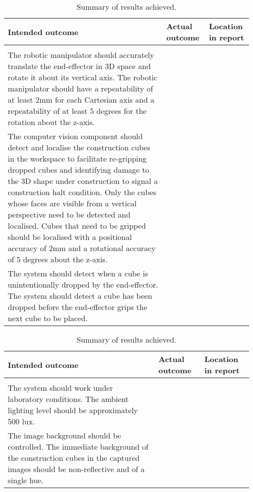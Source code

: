 \begin{table}[h]
	\renewcommand{\arraystretch}{1.3}
	\centering
	\begin{tabular}{|>{\raggedright}m{6.5cm}|>{\raggedright}m{5cm}|>{\raggedright\arraybackslash}m{3cm}|}
		\hline
		\textbf{Intended outcome} & \textbf{Actual outcome} & \textbf{Location in report} \\
		\hline
		\multicolumn{3}{|l|}{\textbf{Core mission requirements and specifications}} \\
		\hline
		The robotic manipulator should accurately translate the end-effector in 3D space and rotate it about its vertical axis. The robotic manipulator should have a repeatability of at least 2mm for each Cartesian axis and a repeatability of at least 5 degrees for the rotation about the z-axis. & & \\
		\hline
		The computer vision component should detect and localise the construction cubes in the workspace to facilitate re-gripping dropped cubes and identifying damage to the 3D shape under construction to signal a construction halt condition. Only the cubes whose faces are visible from a vertical perspective need to be detected and localised. Cubes that need to be gripped should be localised with a positional accuracy of 2mm and a rotational accuracy of 5 degrees about the z-axis. & & \\
		\hline
		The system should detect when a cube is unintentionally dropped by the end-effector. The system should detect a cube has been dropped before the end-effector grips the next cube to be placed. & & \\
		\hline
	\end{tabular}
	\caption{\label{tab:results_summary_p2}Summary of results achieved.}
\end{table}

\begin{table}[h]
	\renewcommand{\arraystretch}{1.3}
	\centering
	\begin{tabular}{|>{\raggedright}m{6.5cm}|>{\raggedright}m{5cm}|>{\raggedright\arraybackslash}m{3cm}|}
		\hline
		\textbf{Intended outcome} & \textbf{Actual outcome} & \textbf{Location in report} \\
		\hline
		\multicolumn{3}{|l|}{\textbf{Field condition requirements and specifications}} \\
		\hline
		The system should work under laboratory conditions. The ambient lighting level should be approximately 500 lux. & & \\
		\hline
		The image background should be controlled. The immediate background of the construction cubes in the captured images should be non-reflective and of a single hue.& & \\
		\hline
	\end{tabular}
	\caption{\label{tab:results_summary_p3}Summary of results achieved.}
\end{table}

